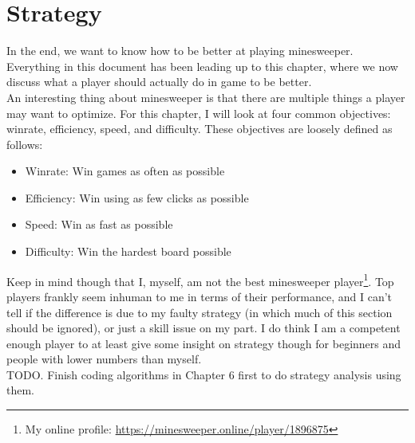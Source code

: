 \chapter{Strategy}

In the end, we want to know how to be better at playing minesweeper. Everything in this document has been leading up to this chapter, where we now discuss what a player should actually do in game to be better.\\

An interesting thing about minesweeper is that there are multiple things a player may want to optimize. For this chapter, I will look at four common objectives: winrate, efficiency, speed, and difficulty. These objectives are loosely defined as follows:\begin{itemize}
    \item Winrate: Win games as often as possible
    \item Efficiency: Win using as few clicks as possible
    \item Speed: Win as fast as possible
    \item Difficulty: Win the hardest board possible
\end{itemize}

Keep in mind though that I, myself, am not the best minesweeper player\footnote{My online profile: \url{https://minesweeper.online/player/1896875}}. Top players frankly seem inhuman to me in terms of their performance, and I can't tell if the difference is due to my faulty strategy (in which much of this section should be ignored), or just a skill issue on my part. I do think I am a competent enough player to at least give some insight on strategy though for beginners and people with lower numbers than myself.\\

TODO. Finish coding algorithms in Chapter 6 first to do strategy analysis using them.\\







